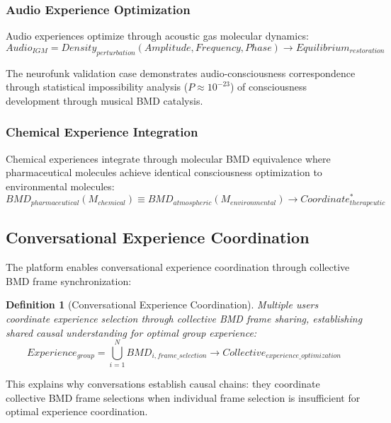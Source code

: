 \documentclass[12pt,a4paper]{article}
\newtheorem{definition}{Definition}
\begin{document}
\subsubsection{Audio Experience Optimization}

Audio experiences optimize through acoustic gas molecular dynamics:
\begin{equation}
Audio_{IGM} = Density_{perturbation}(Amplitude, Frequency, Phase) \rightarrow Equilibrium_{restoration}
\end{equation}

The neurofunk validation case demonstrates audio-consciousness correspondence through statistical impossibility analysis ($P \approx 10^{-23}$) of consciousness development through musical BMD catalysis.

\subsubsection{Chemical Experience Integration}

Chemical experiences integrate through molecular BMD equivalence where pharmaceutical molecules achieve identical consciousness optimization to environmental molecules:
\begin{equation}
BMD_{pharmaceutical}(M_{chemical}) \equiv BMD_{atmospheric}(M_{environmental}) \rightarrow Coordinate_{therapeutic}^*
\end{equation}

\subsection{Conversational Experience Coordination}

The platform enables conversational experience coordination through collective BMD frame synchronization:

\begin{definition}[Conversational Experience Coordination]
Multiple users coordinate experience selection through collective BMD frame sharing, establishing shared causal understanding for optimal group experience:
\begin{equation}
Experience_{group} = \bigcup_{i=1}^{N} BMD_{i,frame\_selection} \rightarrow Collective_{experience\_optimization}
\end{equation}
\end{definition}

This explains why conversations establish causal chains: they coordinate collective BMD frame selections when individual frame selection is insufficient for optimal experience coordination.
\end{document}
